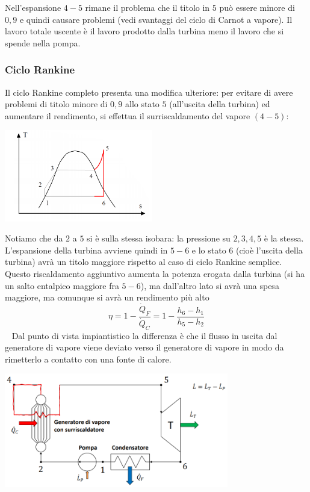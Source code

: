 \newline
Nell'espansione $4-5$ rimane il problema che il titolo in $5$ può essere minore di $0,9$ e quindi causare problemi (vedi svantaggi del ciclo di Carnot a vapore).\newline
\newline
Il lavoro totale uscente è il lavoro prodotto dalla turbina meno il lavoro che si spende nella pompa.
\subsubsection{Ciclo Rankine}
Il ciclo Rankine completo presenta una modifica ulteriore: per evitare di avere problemi di titolo minore di $0,9$ allo stato $5$ (all'uscita della turbina) ed aumentare il rendimento, si effettua il surriscaldamento del vapore $(4-5)$:
\begin{center}
    \includegraphics[height=4cm]{../L08/img7.PNG}
\end{center}
Notiamo che da $2$ a $5$ si è sulla stessa isobara: la pressione su $2,3,4,5$ è la stessa.\newline
\newline
L'espansione della turbina avviene quindi in $5-6$ e lo stato $6$ (cioè l'uscita della turbina) avrà un titolo maggiore rispetto al caso di ciclo Rankine semplice.\newline
\newline
Questo riscaldamento aggiuntivo aumenta la potenza erogata dalla turbina (si ha un salto entalpico maggiore fra $5-6$), ma dall'altro lato si avrà una spesa maggiore, ma comunque si avrà un rendimento più alto
\[
    \eta = 1- \frac{\dot{Q}_F}{\dot{Q}_C} = 1- \frac{h_6-h_1}{h_5-h_2}
\]
\ \newline
Dal punto di vista impiantistico la differenza è che il flusso in uscita dal generatore di vapore viene deviato verso il generatore di vapore in modo da rimetterlo a contatto con una fonte di calore.
\begin{center}
    \includegraphics[height=5cm]{../L08/img8.PNG}
\end{center}
